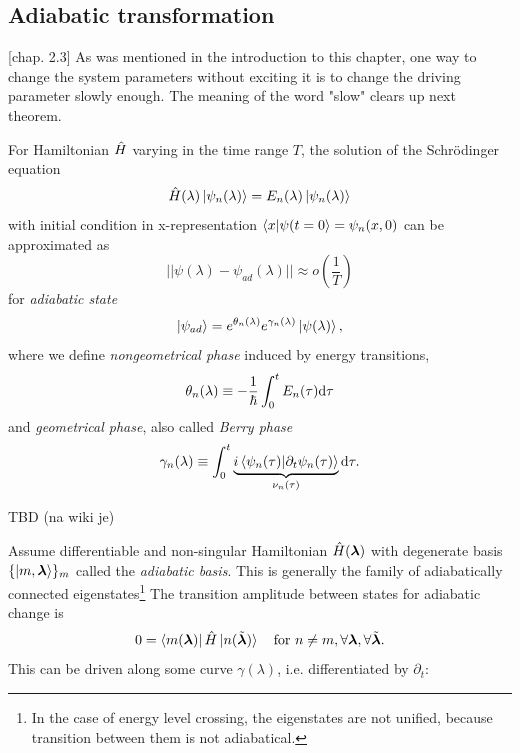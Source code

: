 \subsection{Adiabatic transformation}
\citep{kolodrubez}[chap. 2.3]
As was mentioned in the introduction to this chapter, one way to change the system parameters without exciting it is to change the driving parameter slowly enough. The meaning of the word "slow" clears up next theorem.
\begin{thm}
    \label{adiabaticTheorem}
    For Hamiltonian $\hat{H}$ varying in the time range $T$, the solution of the Schrödinger equation 
    $$\hat{H}(\lambda)\ket{\psi_n(\lambda)} = E_n(\lambda)\ket{\psi_n(\lambda)}$$
    with initial condition in x-representation $\braket{x|\psi(t=0}=\psi_n(x,0)$ can be approximated as
    \begin{equation}
      ||\psi(\lambda) - \psi_{ad}(\lambda)||\approx o\left(\frac{1}{T}\right)
    \end{equation}
    for \emph{adiabatic state}
    \begin{equation}
        \ket{\psi_{ad}}= e^{\theta_n(\lambda)}e^{\gamma_n(\lambda)}\ket{\psi(\lambda)},
    \end{equation}
    where we define \emph{nongeometrical phase} induced by energy transitions,
    $$\theta_n(\lambda)\equiv -\frac{1}{\hbar}\int_0^t E_n(\tau)\mathrm{d} \tau$$
    and \emph{geometrical phase}, also called \emph{Berry phase}
        $$\gamma_n(\lambda)\equiv \int_0^t \underbrace{i\braket{\psi_n(\tau)|\partial_t\psi_n(\tau)}}_{\nu_n(\tau)} \mathrm{d} \tau .$$
\end{thm}
\begin{myproof}
    TBD (na wiki je)
\end{myproof}
Assume differentiable and non-singular Hamiltonian $\hat{H}({\bm\lambda})$ with degenerate basis $\{\ket{m,{\bm\lambda}}\}_m$ called the \emph{adiabatic basis}. This is generally the family of adiabatically connected eigenstates\footnote{In the case of energy level crossing, the eigenstates are not unified, because transition between them is not adiabatical.} The transition amplitude between states for adiabatic change is
\begin{equation}
    0=\bra{m({\bm\lambda})}\hat{H}\ket{n(\tilde{{\bm\lambda}})} \quad \text{for }n\neq m, \forall {\bm\lambda},\forall \tilde {{\bm\lambda}}.
\end{equation}
This can be driven along some curve $\gamma(\lambda)$, i.e. differentiated by $\partial_t$:

